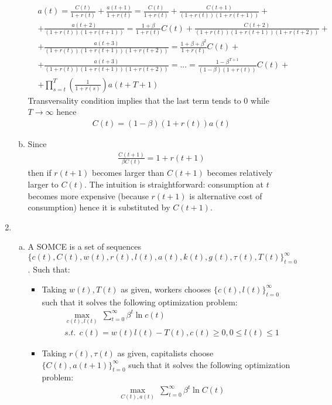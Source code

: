 \documentclass[a4paper]{article}
\begin{document}
\begin{enumerate}
\begin{enumerate}[(a)]
	\begin{align*}
	&a(t) = \frac{C(t)}{1 + r(t)} + \frac{a(t+1)}{1+r(t)} = \frac{C(t)}{1 + r(t)} + \frac{C(t+1)}{(1+r(t))(1+r(t+1))} + \\ &+\frac{a(t+2)}{(1+r(t))(1+r(t+1))} = \frac{1+\beta}{1+r(t)}C(t) + \frac{C(t+2)}{(1+r(t))(1+r(t+1))(1+r(t+2))} + \\
	&+\frac{a(t+3)}{(1+r(t))(1+r(t+1))(1+r(t+2))} = \frac{1+\beta + \beta^2}{1+r(t)}C(t) +\\ &+\frac{a(t+3)}{(1+r(t))(1+r(t+1))(1+r(t+2))} = ... = \frac{1 - \beta^{T+1}}{(1-\beta)(1+r(t))}C(t) +\\ &+\prod_{s=t}^{T}\left(\frac{1}{1+r(s)}\right) a(t+T+1)
	\end{align*}
	Transversality condition implies that the last term tends to 0 while $T \to \infty$ hence
	\begin{align}\label{eq3}
	C(t) = (1 - \beta)(1+r(t))a(t)
	\end{align}
	\item Since
	\begin{align*}
	\frac{C(t+1)}{\beta C(t)} = 1 + r(t+1)
	\end{align*}
	then if $r(t+1)$ becomes larger than $C(t+1)$ becomes relatively larger to $C(t)$. The intuition is straightforward: consumption at $t$ becomes more expensive (because $r(t+1)$ is alternative cost of consumption) hence it is substituted by $C(t+1)$. 
\end{enumerate}
\item \begin{enumerate}[(a)]
	\item A SOMCE is a set of sequences $\{c(t), C(t), w(t), r(t), l(t), a(t), k(t), g(t), \tau(t), T(t)\}_{t=0}^{\infty}$. Such that:
	\begin{itemize}
		\item Taking $w(t), T(t)$ as given, workers chooses $\{c(t), l(t)\}_{t=0}^{\infty}$ such that it solves the following optimization problem:
		\begin{align*}
		&\underset{c(t), l(t)}{\max}\ \sum_{t=0}^{\infty} \beta^t \ln c(t)\\
		&s.t.\ \  c(t) = w(t)l(t) - T(t), c(t) \ge 0, 0 \le l(t) \le 1
		\end{align*}
		\item Taking $r(t), \tau(t)$ as given, capitalists choose $\{C(t), a(t+1)\}_{t=0}^{\infty}$ such that it solves the following optimization problem:
		\begin{align*}
		&\underset{C(t), a(t)}{\max}\ \sum_{t=0}^{\infty} \beta^t \ln C(t)\\

\end{align*}
\end{itemize}
\end{enumerate}
\end{enumerate}
\end{document}
